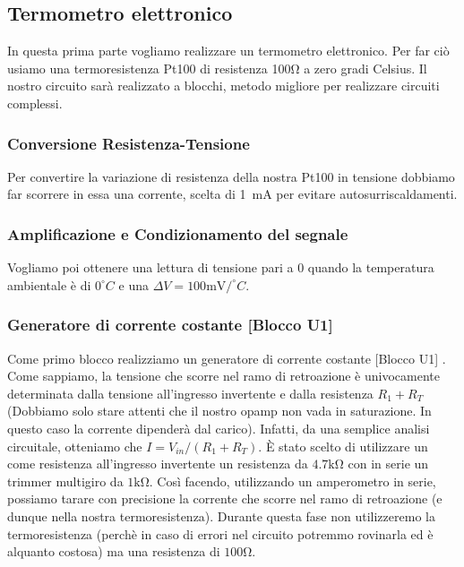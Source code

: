 \subsection{Termometro elettronico}

In questa prima parte vogliamo realizzare un termometro elettronico. Per far ciò usiamo una termoresistenza Pt100 di resistenza 100\si{\ohm} a zero gradi Celsius. Il nostro circuito sarà realizzato a blocchi, metodo migliore per realizzare circuiti complessi.
\subsubsection*{Conversione Resistenza-Tensione}
Per convertire la variazione di resistenza della nostra Pt100 in tensione dobbiamo far scorrere in essa una corrente, scelta di \SI{1}{\milli\ampere} per evitare autosurriscaldamenti. 

\subsubsection*{Amplificazione e Condizionamento del segnale}
Vogliamo poi ottenere una lettura di tensione pari a 0 quando la temperatura ambientale è di $0^{\circ}C$ e una $\Delta V=100\si{\milli\volt}/^{\circ}C$.




\subsubsection{Generatore di corrente costante [Blocco U1]}
Come primo blocco realizziamo un generatore di corrente costante [Blocco U1] . Come sappiamo, la tensione che scorre nel ramo di retroazione è univocamente determinata dalla tensione all'ingresso invertente e dalla resistenza $R_1+R_T$ (Dobbiamo solo stare attenti che il nostro opamp non vada in saturazione. In questo caso la corrente dipenderà dal carico). Infatti, da una semplice analisi circuitale, otteniamo che $I=V_{in}/(R_1+R_T)$. È stato scelto di utilizzare un come resistenza all'ingresso invertente un resistenza da $4.7\si{\kilo\ohm}$ con in serie un trimmer multigiro da $1\si{\kilo\ohm}$. Così facendo, utilizzando un amperometro in serie, possiamo tarare con precisione la corrente che scorre nel ramo di retroazione (e dunque nella nostra termoresistenza). Durante questa fase non utilizzeremo la termoresistenza (perchè in caso di errori nel circuito potremmo rovinarla ed è alquanto costosa) ma una resistenza di $100\si{\ohm}$. 

